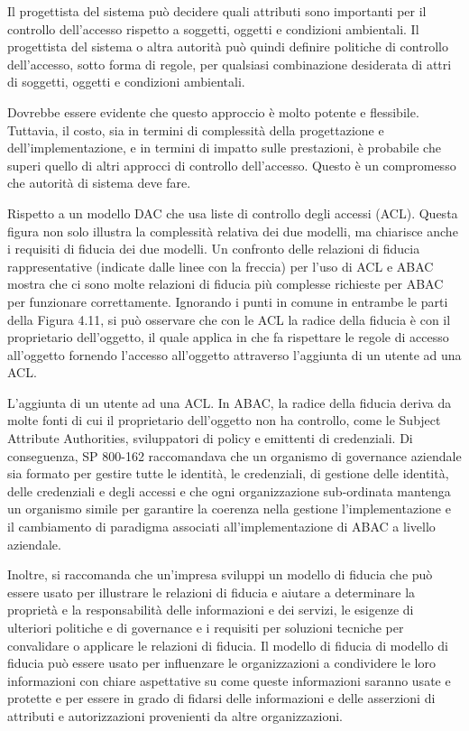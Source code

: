 Il progettista del sistema può decidere quali attributi sono importanti per il controllo dell'accesso rispetto a soggetti, oggetti e condizioni ambientali. Il progettista del sistema o altra autorità può quindi definire politiche di controllo dell'accesso, sotto forma di regole, per qualsiasi combinazione desiderata di attri di soggetti, oggetti e condizioni ambientali.

\singlespacing

Dovrebbe essere evidente che questo approccio è molto potente e flessibile. Tuttavia, il costo, sia in termini di complessità della progettazione e dell'implementazione, e in termini di impatto sulle prestazioni, è probabile che superi quello di altri approcci di controllo dell'accesso. Questo è un compromesso che autorità di sistema deve fare.

\singlespacing

Rispetto a un modello DAC che usa liste di controllo degli accessi (ACL). Questa figura non solo illustra la complessità relativa dei due modelli, ma chiarisce anche i requisiti di fiducia dei due modelli. Un confronto delle relazioni di fiducia rappresentative (indicate dalle linee con la freccia) per l'uso di ACL e ABAC mostra che ci sono molte relazioni di fiducia più complesse richieste per ABAC per funzionare correttamente. Ignorando i punti in comune in entrambe le parti della Figura 4.11, si può osservare che con le ACL la radice della fiducia è con il proprietario dell'oggetto, il quale applica in che fa rispettare le regole di accesso all'oggetto fornendo l'accesso all'oggetto attraverso l'aggiunta di un utente ad una ACL.

\singlespacing

L'aggiunta di un utente ad una ACL. In ABAC, la radice della fiducia deriva da molte fonti di cui il proprietario dell'oggetto non ha controllo, come le Subject Attribute Authorities, sviluppatori di policy e emittenti di credenziali. Di conseguenza, SP 800-162 raccomandava che un organismo di governance aziendale sia formato per gestire tutte le identità, le credenziali, di gestione delle identità, delle credenziali e degli accessi e che ogni organizzazione sub-ordinata mantenga un organismo simile per garantire la coerenza nella gestione l'implementazione e il cambiamento di paradigma associati all'implementazione di ABAC a livello aziendale.

\singlespacing

Inoltre, si raccomanda che un'impresa sviluppi un modello di fiducia che può essere usato per illustrare le relazioni di fiducia e aiutare a determinare la proprietà e la responsabilità delle informazioni e dei servizi, le esigenze di ulteriori politiche e di governance e i requisiti per soluzioni tecniche per convalidare o applicare le relazioni di fiducia. Il modello di fiducia di modello di fiducia può essere usato per influenzare le organizzazioni a condividere le loro informazioni con chiare aspettative su come queste informazioni saranno usate e protette e per essere in grado di fidarsi delle informazioni e delle asserzioni di attributi e autorizzazioni provenienti da altre organizzazioni.

